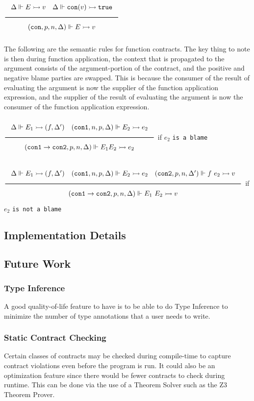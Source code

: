 \documentclass[a4paper]{article}
\newcommand{\Rule}[2]{\genfrac{}{}{0.7pt}{}{{\setlength{\fboxrule}{0pt}\setlength{\fboxsep}{3mm}\fbox{$#1$}}}{{\setlength{\fboxrule}{0pt}\setlength{\fboxsep}{3mm}\fbox{$#2$}}}}
\newcommand{\TruE}{\texttt{true}}
\newcommand{\eval}{\rightarrowtail}
\newcommand{\under}{\Vdash}
\newcommand{\flatCon}{\texttt{con}}
\newcommand{\funCon}{\texttt{con1} \rightarrow \texttt{con2}}
\newcommand{\conA}{\texttt{con1}}
\newcommand{\conB}{\texttt{con2}}
\begin{document}
$\Rule{\Delta \under E \eval v \quad \Delta \under \flatCon(v) \eval \TruE}
{(\flatCon, p, n, \Delta) \under E \eval v}$

The following are the semantic rules for function contracts. The key thing to note is then during
function application, the context that is propagated to the argument consists of the argument-portion of the contract,
and the positive and negative blame parties are swapped. This is because the consumer of the result of evaluating the argument
is now the supplier of the function application expression, and the supplier of the result of evaluating the argument
is now the consumer of the function application expression.

$\Rule{\Delta \under E_1 \eval (f, \Delta') \quad (\conA, n, p, \Delta) \under E_2 \eval e_2}
{(\funCon, p, n, \Delta) \under E_1 E_2 \eval e_2}$ if $e_2$ \texttt{is a blame}

$\Rule{\Delta \under E_1 \eval (f, \Delta') \quad (\conA, n, p, \Delta) \under E_2 \eval e_2 \quad (\conB, p, n, \Delta') \under f\ e_2 \eval v }
{(\funCon, p, n, \Delta) \under E_1\ E_2 \eval v}$ if $e_2$ \texttt{is not a blame}

\subsection{Implementation Details}

\subsection{Future Work}

\subsubsection{Type Inference}

A good quality-of-life feature to have is to be able to do Type Inference to minimize the number of
type annotations that a user needs to write.

\subsubsection{Static Contract Checking}

Certain classes of contracts may be checked during compile-time to capture contract violations
even before the program is run. It could also be an optimization feature since there would be fewer
contracts to check during runtime. This can be done via the use of a Theorem Solver such as the Z3 Theorem Prover.
\end{document}
